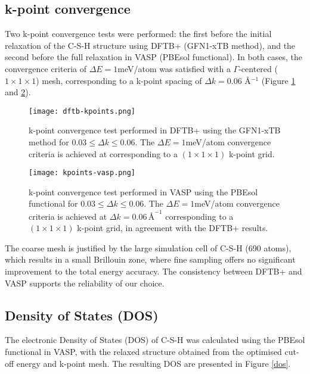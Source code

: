 \subsection{k-point convergence}
 Two k-point convergence tests were performed: the first before the initial relaxation of the C-S-H structure using DFTB+ (GFN1-xTB method), and the second before the full relaxation in VASP (PBEsol functional). In both cases, the convergence criteria of $\Delta E = 1$meV/atom was satisfied with a $\Gamma$-centered ($1\times 1\times 1$) mesh, corresponding to a k-point spacing of $\Delta k=0.06$ Å$^{-1}$ (Figure \ref{dftb-kpoints} and \ref{kpoints-vasp}). 
\begin{figure}[H]
    \centering
    \texttt{[image: dftb-kpoints.png]}
    \caption{k-point convergence test performed in DFTB+ using the GFN1-xTB method for $0.03 \leq \Delta k \leq 0.06$. The 
    $\Delta E = 1$meV/atom convergence criteria is achieved at  corresponding to a $(1\times 1\times 1)$ k-point grid. 
    }
    \label{dftb-kpoints}
\end{figure}

\begin{figure}[H]
    \centering
    \texttt{[image: kpoints-vasp.png]}
    \caption{k-point convergence test performed in VASP using the PBEsol functional for $0.03 \leq \Delta k \leq 0.06$. The $\Delta E = 1$meV/atom convergence criteria is achieved at $\Delta k = 0.06 \,\text{\AA}^{-1}$ corresponding to a $(1\times 1\times 1)$ k-point grid, in agreement with the DFTB+ results.
    }
    \label{kpoints-vasp}
\end{figure}
The coarse mesh is justified by the large simulation cell of C-S-H (690 atoms), which results in a small Brillouin zone, where fine sampling offers no significant improvement to the total energy accuracy\supercite{Kresse1996}. The consistency between DFTB+ and VASP supports the reliability of our choice.  
\subsection{Density of States (DOS)}
The electronic Density of States (DOS) of C-S-H was calculated using the PBEsol functional in VASP, with the relaxed structure obtained from the optimised cut-off energy and k-point mesh. The resulting DOS are presented in Figure \ref{dos}.

